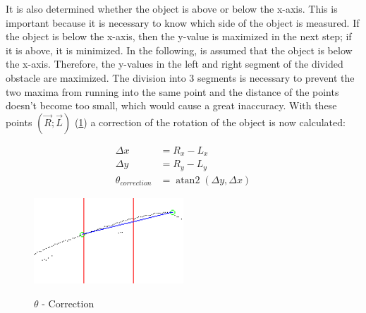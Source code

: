 \documentclass[11pt,oneside,openright]{mpreport}
\DeclareMathOperator{\atantwo}{atan2}
\begin{document}

It is also determined whether the object is above or below the x-axis. This is important because it is necessary to know which side of the object is measured.
If the object is below the x-axis, then the y-value is maximized in the next step; if it is above, it is minimized.
In the following, is assumed that the object is below the x-axis. Therefore, the y-values in the left and right segment of the divided obstacle are maximized.
The division into 3 segments is necessary to prevent the two maxima from running into the same point and the distance of the points doesn't become too small, 
which would cause a great inaccuracy. With these points $(\vec{R};\vec{L})$ (\cref{obst_correction}) a correction of the rotation of the object is now calculated:

\begin{align*}
\Delta x &= R_x - L_x\\
\Delta y &= R_y - L_y\\
\theta_{correction} &= \atantwo(\Delta y,\Delta x)
\end{align*}

\begin{figure}[!ht]
\begin{center}
\caption{$\theta$ - Correction}
\includegraphics[width=0.5\textwidth]{bilder/obst_devide_angle.png}
\label{obst_correction}
\end{center}
\end{figure}
\end{document}

